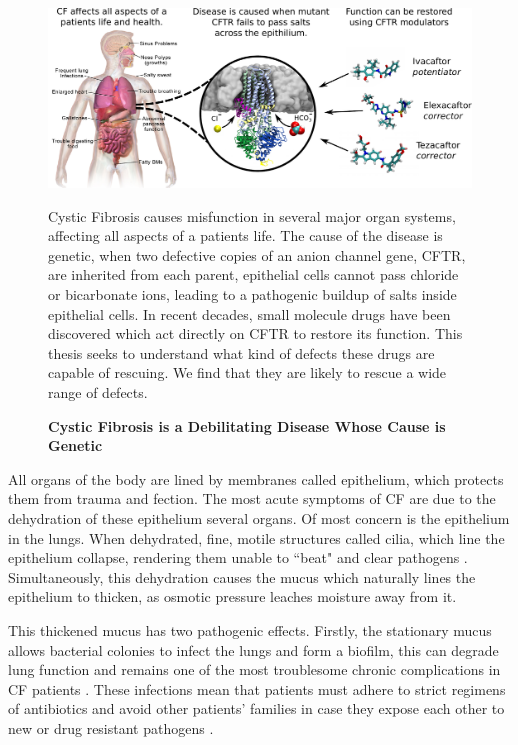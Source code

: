 \begin{figure}
	\label{CF_summary}
	\begin{center}
	\includegraphics[width=1\textwidth]{figures/cf_summary_fig.pdf}
	\end{center}
	\captionsetup{singlelinecheck = false, justification=raggedright}
	\caption[Cystic Fibrosis is a Debilitating Disease Whose Cause is Genetic] {\textbf{Cystic Fibrosis is a Debilitating Disease Whose Cause is Genetic}}{Cystic Fibrosis causes misfunction in several major organ systems, affecting all aspects of a patients life. The cause of the disease is genetic, when two defective copies of an anion channel gene, CFTR, are inherited from each parent, epithelial cells cannot pass chloride or bicarbonate ions, leading to a pathogenic buildup of salts inside epithelial cells. In recent decades, small molecule drugs have been discovered which act directly on CFTR to restore its function. This thesis seeks to understand what kind of defects these drugs are capable of rescuing. We find that they are likely to rescue a wide range of defects.} 
\end{figure}

All organs of the body are lined by membranes called epithelium, which protects them from trauma and fection. The most acute symptoms of CF are due to the dehydration of these epithelium several organs. Of most concern is the epithelium in the lungs. When dehydrated, fine, motile structures called cilia, which line the epithelium collapse, rendering them unable to ``beat" and clear pathogens \cite{boucher2007}. Simultaneously, this dehydration causes the mucus which naturally lines the epithelium to thicken, as osmotic pressure leaches moisture away from it. 

This thickened mucus has two pathogenic effects. Firstly, the stationary mucus allows bacterial colonies to infect the lungs and form a biofilm, this can degrade lung function and remains one of the most troublesome chronic complications in CF patients \cite{chiappini2014}. These infections mean that patients must adhere to strict regimens of antibiotics and avoid other patients' families in case they expose each other to new or drug resistant pathogens \cite{conway2008}. 

